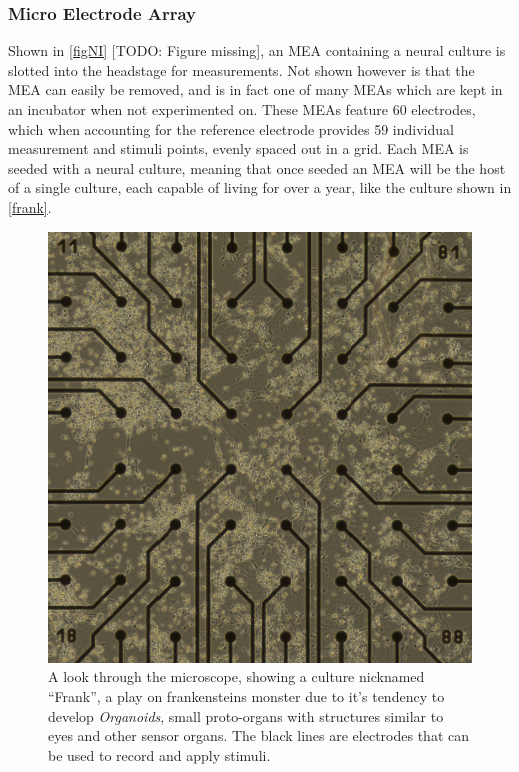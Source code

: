 \subsubsection{Micro Electrode Array}
Shown in \ref{figNI} [TODO: Figure missing], an MEA containing a neural culture is slotted into the
headstage for measurements.
Not shown however is that the MEA can easily be removed, and is in fact one of
many MEAs which are kept in an incubator when not experimented on.
These MEAs feature 60 electrodes, which when accounting for the reference
electrode provides 59 individual measurement and stimuli points, evenly spaced
out in a grid.
Each MEA is seeded with a neural culture, meaning that once seeded an MEA will
be the host of a single culture, each capable of living for over a year, like
the culture shown in \ref{frank}.
\begin{figure}[h]
  \centering
  \includegraphics[width=1\textwidth]{fig/frank.png}
  \caption{
    A look through the microscope, showing a culture nicknamed ``Frank'', a
    play on frankensteins monster due to it's tendency to develop \emph{Organoids},
    small proto-organs with structures similar to eyes and other sensor organs.
    The black lines are electrodes that can be used to record and apply stimuli.
  }
  \label{figDopey}
\end{figure}
